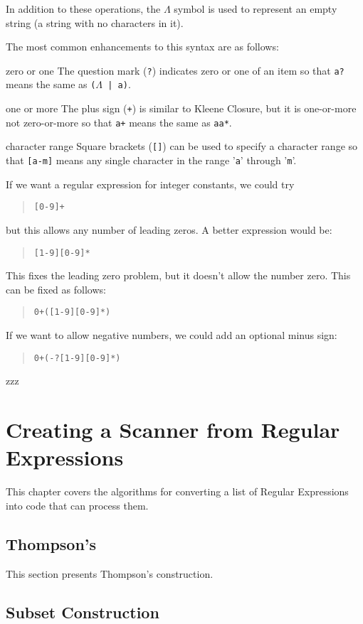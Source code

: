 \documentclass[letterpaper,12pt,openany,reqno]{book}%
\newenvironment{mydesc}[1][9em]
  {
     \begin{basedescript}
     {
      \renewcommand{\makelabel}[1]{\bfseries##1}
      \desclabelwidth{ #1 }
      \desclabelstyle{\multilinelabel}
     }
  }
  {
     \end{basedescript}%
  }
\begin{document}
In addition to these operations, the $\Lambda$ symbol is used to represent an empty string (a string with no characters in it).

The most common enhancements to this syntax are as follows:
\begin{mydesc}
\item[zero or one] The question mark (\texttt{?}) indicates zero or one of an item so that \texttt{a?} means the same as \texttt{($\Lambda$ | a)}.
\item[one or more] The plus sign (\texttt{+}) is similar to Kleene Closure, but it is one-or-more not zero-or-more so that \texttt{a+} means the same as \texttt{aa*}.
\item[character range] Square brackets (\texttt{[]}) can be used to specify a character range so that \texttt{[a-m]} means any single character in the range '\texttt{a}' through '\texttt{m}'.
\end{mydesc}

If we want a regular expression for integer constants, we could try
\begin{quote}\texttt{[0-9]+}\end{quote}
but this allows any number of leading zeros. A better expression would be:
\begin{quote}\texttt{[1-9][0-9]*}\end{quote}
This fixes the leading zero problem, but it doesn't allow the number zero. This can be fixed as follows:
\begin{quote}\texttt{0+([1-9][0-9]*)}\end{quote}
If we want to allow negative numbers, we could add an optional minus sign:
\begin{quote}\texttt{0+(-?[1-9][0-9]*)}\end{quote}

zzz
\chapter{Creating a Scanner from Regular Expressions}

This chapter covers the algorithms for converting a list of Regular Expressions into code that can process them.

\section{Thompson's}

This section presents Thompson's construction.

\section{Subset Construction}
\end{document}
